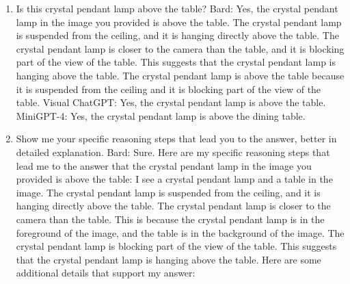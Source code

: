 \begin{enumerate}
    Do you have other questions or requests?
    \subitem Visual ChatGPT: The crystal pendant lamp is hanging above the table.
    \subitem MiniGPT-4: The crystal pendant lamp is hanging from the ceiling above the dining table. The table is made of wood and has six chairs around it. The room has white walls and a white floor. There is a window on the wall to the left of the table.
    \item Is this crystal pendant lamp above the table?
    \subitem Bard: Yes, the crystal pendant lamp in the image you provided is above the table. The crystal pendant lamp is suspended from the ceiling, and it is hanging directly above the table. The crystal pendant lamp is closer to the camera than the table, and it is blocking part of the view of the table. This suggests that the crystal pendant lamp is hanging above the table. The crystal pendant lamp is above the table because it is suspended from the ceiling and it is blocking part of the view of the table.
    \subitem Visual ChatGPT: Yes, the crystal pendant lamp is above the table.
    \subitem MiniGPT-4: Yes, the crystal pendant lamp is above the dining table.
    \item Show me your specific reasoning steps that lead you to the answer, better in detailed explanation.
    \subitem Bard: 
    Sure. Here are my specific reasoning steps that lead me to the answer that the crystal pendant lamp in the image you provided is above the table:
    I see a crystal pendant lamp and a table in the image.
    The crystal pendant lamp is suspended from the ceiling, and it is hanging directly above the table.
    The crystal pendant lamp is closer to the camera than the table. This is because the crystal pendant lamp is in the foreground of the image, and the table is in the background of the image.
    The crystal pendant lamp is blocking part of the view of the table. This suggests that the crystal pendant lamp is hanging above the table.
    Here are some additional details that support my answer:


\end{enumerate}

